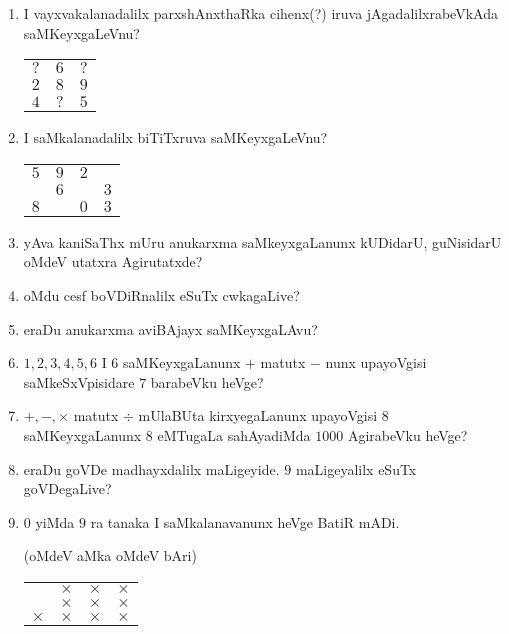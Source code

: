 \begin{enumerate}
\item I vayxvakalanadalilx parxshAnxthaRka cihenx(?) iruva jAgadalilxrabeVkAda saMKeyxgaLeVnu?
\begin{center}
\begin{tabular}{ccc}
$?$ & $6$ & $?$\\
$2$ & $8$ & $9$\\
\hline
$4$ & $?$ & $5$
\end{tabular}
\end{center}

\newpage

\item I saMkalanadalilx \underline{\qquad} biTiTxruva saMKeyxgaLeVnu?
\begin{center}
\begin{tabular}{cccc}
$5$ & $9$ & $2$ & \underline{\quad}\\
\underline{\quad} & $6$ & \underline{\quad} & $3$\\
\hline
$8$ & \underline{\quad} & $0$ & $3$
\end{tabular}
\end{center}

\item yAva kaniSaThx mUru anukarxma saMkeyxgaLanunx kUDidarU, guNisidarU oMdeV utatxra Agirutatxde?

\item oMdu cesf boVDiRnalilx eSuTx cwkagaLive?

\item eraDu anukarxma aviBAjayx saMKeyxgaLAvu?

\item $1,2,3,4,5,6$ I $6$ saMKeyxgaLanunx $+$ matutx $-$ nunx upayoVgisi saMkeSxVpisidare $7$ barabeVku heVge?

\item $+,-,\times$ matutx $\div$ mUlaBUta kirxyegaLanunx upayoVgisi $8$ saMKeyxgaLanunx $8$ eMTugaLa sahAyadiMda $1000$ AgirabeVku heVge?

\item eraDu goVDe madhayxdalilx maLigeyide. $9$ maLigeyalilx eSuTx goVDegaLive?

\item $0$ yiMda $9$ ra tanaka I saMkalanavanunx heVge BatiR mADi.

(oMdeV aMka oMdeV bAri)
\begin{center}
\begin{tabular}{cccc}
 & $\times$ & $\times$ & $\times$\\
 & $\times$ & $\times$ & $\times$\\
\hline
$\times$ & $\times$ & $\times$ & $\times$\\
\end{tabular}
\end{center}


\end{enumerate}
